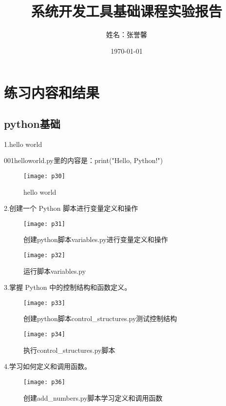\documentclass[a4paper ,12pt]{article}
\begin{document}
	
	\title{系统开发工具基础课程实验报告}
	\author{姓名：张誉馨}
	\date{\today}
	\maketitle
	
	\tableofcontents
	\newpage
	
	\section{练习内容和结果}
	
	\subsection{python基础}
	1.hello world      
	
	001helloworld.py里的内容是：print("Hello, Python!")
	
	\begin{figure}[h]
		\centering
		\texttt{[image: p30]}
		\caption{hello world}
	\end{figure}
	
	2.创建一个 Python 脚本进行变量定义和操作
	
	\begin{figure}[h]
		\centering
		\texttt{[image: p31]}
		\caption{创建python脚本variables.py进行变量定义和操作}
	\end{figure}
	
	\begin{figure}[h]
		\centering
		\texttt{[image: p32]}
		\caption{运行脚本variables.py}
	\end{figure}
	
	3.掌握 Python 中的控制结构和函数定义。
	
	\begin{figure}[h]
		\centering
		\texttt{[image: p33]}
		\caption{创建python脚本control\_structures.py测试控制结构}
	\end{figure}
	
	\begin{figure}[h]
		\centering
		\texttt{[image: p34]}
		\caption{执行control\_structures.py脚本}
	\end{figure}
	
	4.学习如何定义和调用函数。
	
	\begin{figure}[h]
		\centering
		\texttt{[image: p36]}
		\caption{创建add\_numbers.py脚本学习定义和调用函数}
	\end{figure}
	
\end{document}
